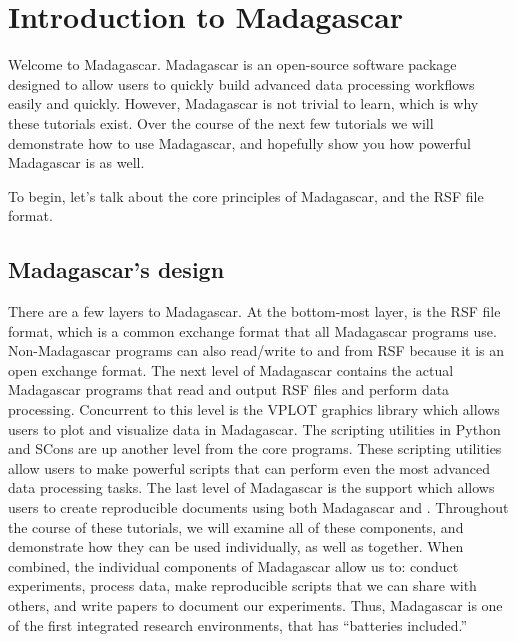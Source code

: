 \section{Introduction to Madagascar}
Welcome to Madagascar.  Madagascar is an open-source software package designed to allow users to quickly build advanced data processing workflows easily and quickly.  However, Madagascar is not trivial to learn, which is why these tutorials exist. Over the course of the next few tutorials we will demonstrate how to use Madagascar, and hopefully show you how powerful Madagascar is as well.

To begin, let's talk about the core principles of Madagascar, and the RSF file format.  

\setlength{\unitlength}{1cm}
\begin{comment}
\begin{figure}
    \begin{picture}(8,8)(0,0)
        \put(0,7){\framebox(8,1){Madagascar}}
        \put(2,6){\framebox(4,1){RSF file format}}
        \put(0,5){\framebox(3,1){something}}
    \end{picture}
\end{figure}
\end{comment}

\subsection{Madagascar's design}

There are a few layers to Madagascar.  At the bottom-most layer, is the RSF file format, which is a common exchange format that all Madagascar programs use.  Non-Madagascar programs can also read/write to and from RSF because it is an open exchange format.  The next level of Madagascar contains the actual Madagascar programs that read and output RSF files and perform data processing.  Concurrent to this level is the VPLOT graphics library which allows users to plot and visualize data in Madagascar.  The scripting utilities in Python and SCons are up another level from the core programs.  These scripting utilities allow users to make powerful scripts that can perform even the most advanced data processing tasks.  The last level of Madagascar is the support which allows users to create reproducible documents using both Madagascar and .  Throughout the course of these tutorials, we will examine all of these components, and demonstrate how they can be used individually, as well as together.  When combined, the individual components of Madagascar allow us to: conduct experiments, process data, make reproducible scripts that we can share with others, and write papers to document our experiments.  Thus, Madagascar is one of the first integrated research environments, that has ``batteries included.''

